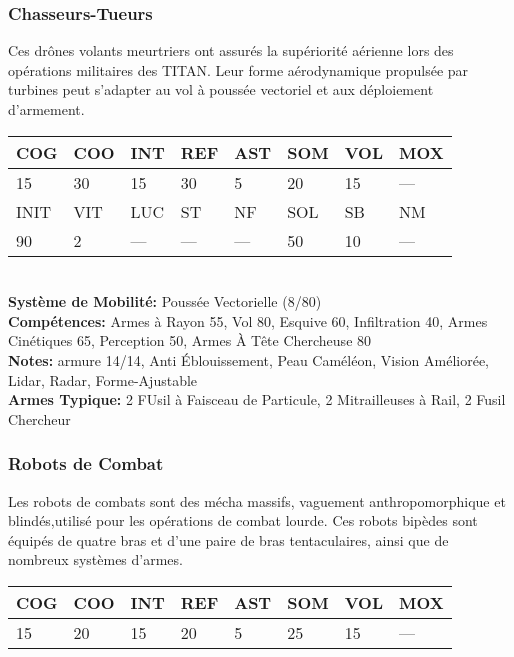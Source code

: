 {\subsubsection{Chasseurs-Tueurs} 

Ces drônes volants meurtriers ont assurés la supériorité aérienne lors des opérations militaires des TITAN. Leur forme aérodynamique propulsée par turbines peut s'adapter au vol à poussée vectoriel et aux déploiement d'armement. \\ \begin{tabular}{|l|l|l|l|l|l|l|l|} \hline

COG &COO &INT &REF &AST &SOM &VOL &MOX \\ \hline

15 &30 &15 &30 &5 &20 &15 &— \\ \hline

INIT &VIT &LUC &ST &NF &SOL &SB &NM \\ \hline

90 &2 &— &— &— &50 &10 &— \\ \hline

\end{tabular} \\ \textbf{Système de Mobilité: }Poussée Vectorielle (8/80) \\ \textbf{Compétences:} Armes à Rayon 55, Vol 80, Esquive 60, Infiltration 40, Armes Cinétiques 65, Perception 50, Armes À Tête Chercheuse 80 \\ \textbf{Notes:} armure 14/14, Anti Éblouissement, Peau Caméléon, Vision Améliorée, Lidar, Radar, Forme-Ajustable \\ \textbf{Armes Typique:} 2 FUsil à Faisceau de Particule, 2 Mitrailleuses à Rail, 2 Fusil Chercheur 

\subsubsection{Robots de Combat} 

Les robots de combats sont des mécha massifs, vaguement anthropomorphique et blindés,utilisé pour les opérations de combat lourde. Ces robots bipèdes sont équipés de quatre bras et d'une paire de bras tentaculaires, ainsi que de nombreux systèmes d'armes. \\ \begin{tabular}{|l|l|l|l|l|l|l|l|} \hline

COG &COO &INT &REF &AST &SOM &VOL &MOX \\ \hline

15 &20 &15 &20 &5 &25 &15 &— \\ \hline


\end{tabular}}
